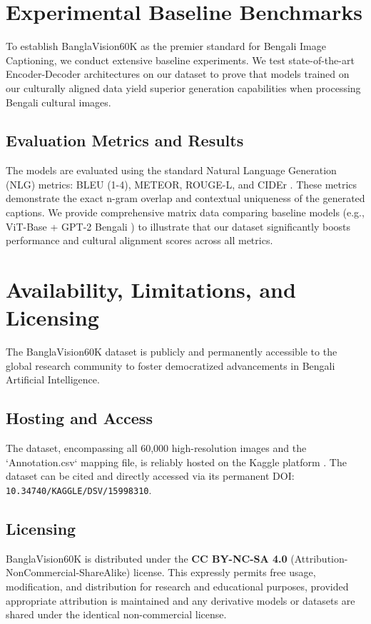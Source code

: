 \documentclass[conference]{IEEEtran}
\begin{document}
\section{Experimental Baseline Benchmarks}
To establish BanglaVision60K as the premier standard for Bengali Image Captioning, we conduct extensive baseline experiments. We test state-of-the-art Encoder-Decoder architectures on our dataset to prove that models trained on our culturally aligned data yield superior generation capabilities when processing Bengali cultural images.

\subsection{Evaluation Metrics and Results}
The models are evaluated using the standard Natural Language Generation (NLG) metrics: BLEU (1-4), METEOR, ROUGE-L, and CIDEr \cite{young2014image}. These metrics demonstrate the exact n-gram overlap and contextual uniqueness of the generated captions. We provide comprehensive matrix data comparing baseline models (e.g., ViT-Base + GPT-2 Bengali \cite{rahman2026optimizing}) to illustrate that our dataset significantly boosts performance and cultural alignment scores across all metrics.

\section{Availability, Limitations, and Licensing}
The BanglaVision60K dataset is publicly and permanently accessible to the global research community to foster democratized advancements in Bengali Artificial Intelligence. 

\subsection{Hosting and Access}
The dataset, encompassing all 60,000 high-resolution images and the `Annotation.csv` mapping file, is reliably hosted on the Kaggle platform \cite{hasibur2026banglavision60k}. 
The dataset can be cited and directly accessed via its permanent DOI: \texttt{10.34740/KAGGLE/DSV/15998310}.

\subsection{Licensing}
BanglaVision60K is distributed under the \textbf{CC BY-NC-SA 4.0} (Attribution-NonCommercial-ShareAlike) license. This expressly permits free usage, modification, and distribution for research and educational purposes, provided appropriate attribution is maintained and any derivative models or datasets are shared under the identical non-commercial license.
\end{document}
